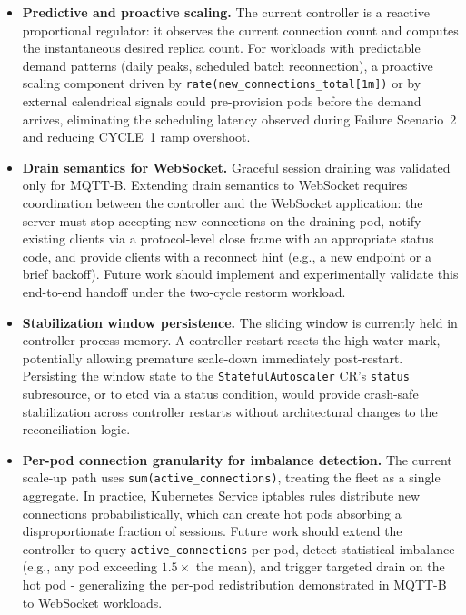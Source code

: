 \documentclass[twocolumn]{svjour3}
\begin{document}
\begin{itemize}[leftmargin=*]
  \item \textbf{Predictive and proactive scaling.} The current controller is a reactive proportional regulator: it observes the current connection count and computes the instantaneous desired replica count. For workloads with predictable demand patterns (daily peaks, scheduled batch reconnection), a proactive scaling component driven by \texttt{rate(new\_connections\_total[1m])} or by external calendrical signals could pre-provision pods before the demand arrives, eliminating the scheduling latency observed during Failure Scenario~2 and reducing CYCLE~1 ramp overshoot.

  \item \textbf{Drain semantics for WebSocket.} Graceful session draining was validated only for MQTT-B. Extending drain semantics to WebSocket requires coordination between the controller and the WebSocket application: the server must stop accepting new connections on the draining pod, notify existing clients via a protocol-level close frame with an appropriate status code, and provide clients with a reconnect hint (e.g., a new endpoint or a brief backoff). Future work should implement and experimentally validate this end-to-end handoff under the two-cycle restorm workload.

  \item \textbf{Stabilization window persistence.} The sliding window is currently held in controller process memory. A controller restart resets the high-water mark, potentially allowing premature scale-down immediately post-restart. Persisting the window state to the \texttt{StatefulAutoscaler} CR's \texttt{status} subresource, or to etcd via a status condition, would provide crash-safe stabilization across controller restarts without architectural changes to the reconciliation logic.

  \item \textbf{Per-pod connection granularity for imbalance detection.} The current scale-up path uses \texttt{sum(active\_connections)}, treating the fleet as a single aggregate. In practice, Kubernetes Service iptables rules distribute new connections probabilistically, which can create hot pods absorbing a disproportionate fraction of sessions. Future work should extend the controller to query \texttt{active\_connections} per pod, detect statistical imbalance (e.g., any pod exceeding $1.5\times$ the mean), and trigger targeted drain on the hot pod - generalizing the per-pod redistribution demonstrated in MQTT-B to WebSocket workloads.


\end{itemize}
\end{document}
